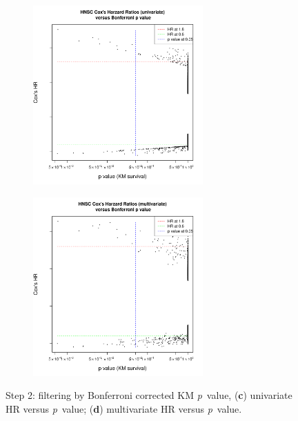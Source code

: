 \documentclass[
paper=landscape,
paper=160mm:90mm, %
fontsize=11pt, %
pagesize, %
parskip=half-, %
]{scrartcl} %
\theoremstyle{mythmstyle} %
\begin{document}
\clearpage
\begin{figure}
    \begin{subfigure}[b]{0.45\textwidth}
        \includegraphics[width=6.5cm]{Rplot02_BonferroniP_uniHR.pdf}
    \end{subfigure} \hfill
    \begin{subfigure}[b]{0.45\textwidth}
        \includegraphics[width=6.5cm]{Rplot02_BonferroniP_multiHR.pdf}
    \end{subfigure}

\caption{
Step 2: filtering by Bonferroni corrected KM \textit{p}~value, 
(\textbf{c}) univariate HR versus \textit{p}~value; (\textbf{d}) multivariate HR versus \textit{p}~value.}

\end{figure}%
\end{document}

